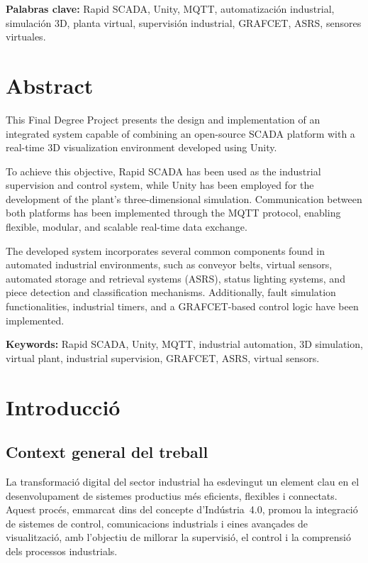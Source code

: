 \documentclass[a4paper,11pt,DIV=13,headings=normal,abstract=true,twoside=semi]{article}
\begin{document}
\bigskip

\textbf{Palabras clave:} Rapid SCADA, Unity, MQTT, automatización industrial, simulación 3D, planta virtual, supervisión industrial, GRAFCET, ASRS, sensores virtuales.


\section*{Abstract}

This Final Degree Project presents the design and implementation of an integrated system capable of combining an open-source SCADA platform with a real-time 3D visualization environment developed using Unity.

To achieve this objective, Rapid SCADA has been used as the industrial supervision and control system, while Unity has been employed for the development of the plant's three-dimensional simulation. Communication between both platforms has been implemented through the MQTT protocol, enabling flexible, modular, and scalable real-time data exchange.

The developed system incorporates several common components found in automated industrial environments, such as conveyor belts, virtual sensors, automated storage and retrieval 
systems (ASRS), status lighting systems, and piece detection and classification mechanisms. Additionally, fault simulation functionalities, industrial timers, and a GRAFCET-based control logic have been implemented.

\bigskip
\textbf{Keywords:} Rapid SCADA, Unity, MQTT, industrial automation, 3D simulation, virtual plant, industrial supervision, GRAFCET, ASRS, virtual sensors.
\newpage


\tableofcontents
\newpage
\listoffigures 
\listoftables
\cleardoublepage
\newpage

\section{Introducció}

\subsection{Context general del treball}

La transformació digital del sector industrial ha esdevingut un element clau en el desenvolupament de sistemes productius més eficients, flexibles i connectats. Aquest procés, emmarcat dins del concepte d'Indústria~4.0, promou la integració de sistemes de control, comunicacions industrials i eines avançades de visualització, amb l'objectiu de millorar la supervisió, el control i la comprensió dels processos industrials.
\end{document}
